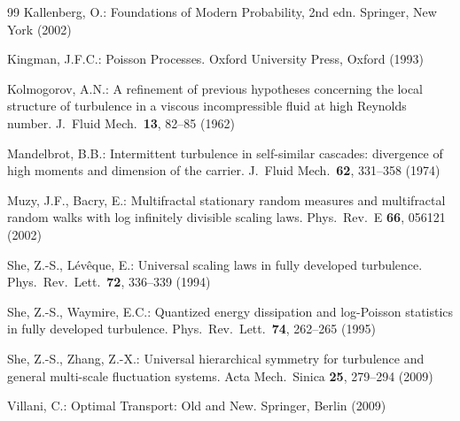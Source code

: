\documentclass[pdflatex,sn-mathphys-num]{sn-jnl}
\theoremstyle{thmstyleone}
\theoremstyle{thmstyletwo}
\theoremstyle{thmstylethree}
\begin{document}
\begin{thebibliography}{99}
Kallenberg, O.:
Foundations of Modern Probability, 2nd edn.
Springer, New York (2002)

Kingman, J.F.C.:
Poisson Processes.
Oxford University Press, Oxford (1993)

Kolmogorov, A.N.:
A refinement of previous hypotheses concerning the local structure of
turbulence in a viscous incompressible fluid at high Reynolds number.
J.\ Fluid Mech.\ \textbf{13}, 82--85 (1962)

Mandelbrot, B.B.:
Intermittent turbulence in self-similar cascades: divergence of high
moments and dimension of the carrier.
J.\ Fluid Mech.\ \textbf{62}, 331--358 (1974)

Muzy, J.F., Bacry, E.:
Multifractal stationary random measures and multifractal random
walks with log infinitely divisible scaling laws.
Phys.\ Rev.\ E \textbf{66}, 056121 (2002)

She, Z.-S., L\'ev\^eque, E.:
Universal scaling laws in fully developed turbulence.
Phys.\ Rev.\ Lett.\ \textbf{72}, 336--339 (1994)

She, Z.-S., Waymire, E.C.:
Quantized energy dissipation and log-Poisson statistics in fully
developed turbulence.
Phys.\ Rev.\ Lett.\ \textbf{74}, 262--265 (1995)

She, Z.-S., Zhang, Z.-X.:
Universal hierarchical symmetry for turbulence and general multi-scale
fluctuation systems.
Acta Mech.\ Sinica \textbf{25}, 279--294 (2009)

Villani, C.:
Optimal Transport: Old and New.
Springer, Berlin (2009)

\end{thebibliography}
\end{document}
